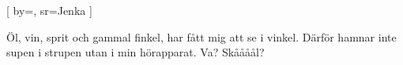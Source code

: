 


[ 	%
	by={},	%
	sr={Jenka}			%
	]		%
	
\beginverse*		%
Öl, vin, sprit och gammal finkel,
har fått mig att se i vinkel.
Därför hamnar inte supen i strupen 
utan i min hörapparat.
Va? Skåååål?
\endverse			%

\vspace{5mm}
\endsong			%
